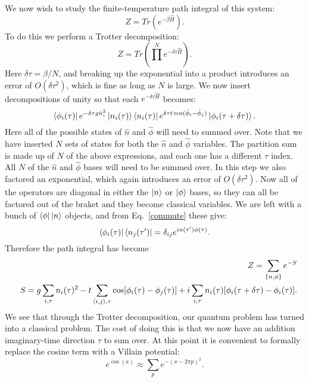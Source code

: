We now wish to study the finite-temperature path integral of this system:
\begin{equation}
Z=Tr(e^{-\beta \hat H}).
\end{equation}
To do this we perform a Trotter decomposition\cite{Trotter}:
\begin{equation}
Z=Tr(\prod^N e^{-\delta\tau \hat H}).
\end{equation}
Here $\delta\tau=\beta/N$, and breaking up the exponential into a product introduces an error of $O(\delta\tau^2)$, which is fine as long as $N$ is large. We now insert decompositions of unity so that each $e^{-\delta\tau\hat H}$ becomes:
\begin{equation}
\bra{\phi_i(\tau)} e^{-\delta\tau g \hat n_i^2} \ket{n_i(\tau)} \bra{n_i(\tau)} e^{\delta\tau t\cos(\hat\phi_i-\hat\phi_j)} \ket{\phi_i(\tau+\delta\tau)}.
\end{equation}
Here all of the possible states of $\hat n$ and $\hat\phi$ will need to summed over. Note that we have inserted $N$ sets of states for both the $\hat n$ and $\hat\phi$ variables. 
The partition sum is made up of $N$ of the above expressions, and each one has a different $\tau$ index. All $N$ of the $\hat n$ and $\hat \phi$ bases will need to be summed over.
In this step we also factored an exponential, which again introduces an error of $O(\delta\tau^2)$. Now all of the operators are diagonal in either the $\ket{n}$ or $\ket{\phi}$ bases, so they can all be factored out of the braket and they become classical variables. We are left with a bunch of $\bra{\phi}\ket{n}$ objects, and from Eq.~\ref{commute} these give:
\begin{equation}
\bra{\phi_i(\tau)}\bra{n_j(\tau^\prime)}=\delta_{ij}e^{i n(\tau^\prime)\phi(\tau)}.
\end{equation}
Therefore the path integral has become
\begin{eqnarray}
&&Z=\sum_{\{n,\phi\}}e^{-S}\nonumber\\
&&S=g\sum_{i,\tau} n_i(\tau)^2-t\sum_{\langle i,j\rangle,\tau} \cos[ \phi_i(\tau)-\phi_j(\tau)]+i\sum_{i,\tau} n_i(\tau)[\phi_i(\tau+\delta\tau)-\phi_i(\tau)].
\label{first_classical}
\end{eqnarray}
We see that through the Trotter decomposition, our quantum problem has turned into a classical problem. The cost of doing this is that we now have an addition imaginary-time direction $\tau$ to sum over. At this point it is convenient to formally replace the cosine term with a Villain potential:
\begin{equation}
e^{\cos(x)}\approx\sum_p e^{-(x-2\pi p)^2}.
\label{Villain}
\end{equation}
